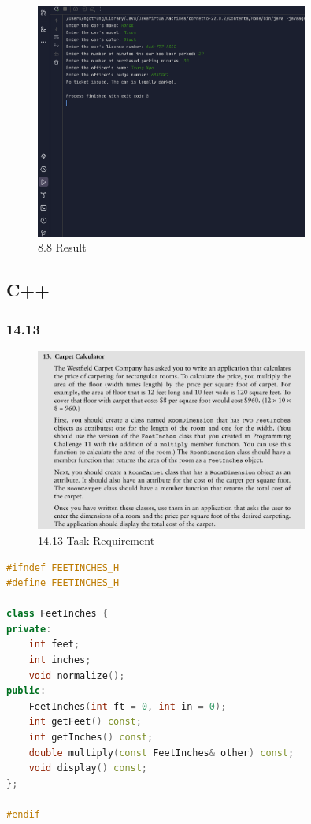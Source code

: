 \documentclass{article}
\begin{document}
\begin{figure}[H]
    \centering
    \includegraphics[width=0.8\textwidth]{./Assets/Results/Assignment12/2.png}
    \caption{8.8 Result}
\end{figure}

\subsection*{C++}

\subsubsection*{14.13}

\begin{figure}[H]
    \centering
    \includegraphics[width=0.8\textwidth]{./Assets/Task requirements/Assignment12/14.13.png}
    \caption{14.13 Task Requirement}
\end{figure}

\begin{lstlisting}[language=C++, caption={FeetInches.h}]
#ifndef FEETINCHES_H
#define FEETINCHES_H

class FeetInches {
private:
    int feet;
    int inches;
    void normalize();
public:
    FeetInches(int ft = 0, int in = 0);
    int getFeet() const;
    int getInches() const;
    double multiply(const FeetInches& other) const;
    void display() const;
};

#endif
\end{lstlisting}
\end{document}
